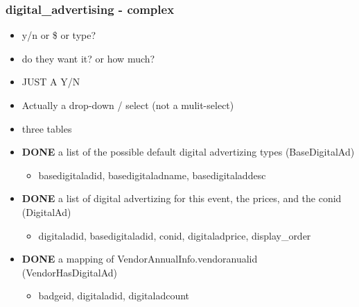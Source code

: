 \documentclass[captions=tablesignature]{scrartcl}
\begin{document}
\subsubsection{digital\_advertising - complex}
\label{sec-2-2-5}
\begin{itemize}
\item y/n or \$ or type?
\item do they want it? or how much?
\item JUST A Y/N
\item Actually a drop-down / select (not a mulit-select)
\item three tables
\end{itemize}
\begin{itemize}
\item {\bfseries\sffamily DONE} a list of the possible default digital advertizing types (BaseDigitalAd)
\label{sec-2-2-5-1}
\begin{itemize}
\item basedigitaladid, basedigitaladname, basedigitaladdesc
\end{itemize}

\item {\bfseries\sffamily DONE} a list of digital advertizing for this event, the prices, and the conid (DigitalAd)
\label{sec-2-2-5-2}
\begin{itemize}
\item digitaladid, basedigitaladid, conid, digitaladprice, display\_order
\end{itemize}

\item {\bfseries\sffamily DONE} a mapping of VendorAnnualInfo.vendoranualid (VendorHasDigitalAd)
\label{sec-2-2-5-3}
\begin{itemize}
\item badgeid, digitaladid, digitaladcount
\end{itemize}
\end{itemize}
\end{document}
